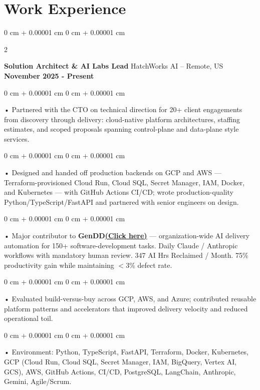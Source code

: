 \documentclass[10pt, letterpaper]{article}
\newenvironment{onecolentry}{
    \begin{adjustwidth}{
        0 cm + 0.00001 cm
    }{
        0 cm + 0.00001 cm
    }
}{
    \end{adjustwidth}
} %
\newenvironment{twocolentry}[2][]{
    \onecolentry
    \def\secondColumn{#2}
    \setcolumnwidth{\fill, 4.5 cm}
    \begin{paracol}{2}
}{
    \switchcolumn \raggedleft \secondColumn
    \end{paracol}
    \endonecolentry
} %
\begin{document}
    \vspace{0.15cm}
    \section{Work Experience}
        \vspace{0.1cm}

        \begin{twocolentry}{
            \textbf{November 2025 - Present}
        }
            \textbf{Solution Architect \& AI Labs Lead} HatchWorks AI -- Remote, US\end{twocolentry}

        \begin{onecolentry}
             • Partnered with the CTO on technical direction for 20+ client engagements from discovery through delivery: cloud-native platform architectures, staffing estimates, and scoped proposals spanning control-plane and data-plane style services.
        \end{onecolentry}
        \begin{onecolentry}
             • Designed and handed off production backends on GCP and AWS --- Terraform-provisioned Cloud Run, Cloud SQL, Secret Manager, IAM, Docker, and Kubernetes --- with GitHub Actions CI/CD; wrote production-quality Python/TypeScript/FastAPI and partnered with senior engineers on design.
        \end{onecolentry}
        \begin{onecolentry}
             • Major contributor to \textbf{GenDD}\href{https://hatchworks.com/generative-driven-development/}{\textbf{(Click here)}} --- organization-wide AI delivery automation for 150+ software-development tasks. Daily Claude / Anthropic workflows with mandatory human review. 347 AI Hrs Reclaimed / Month. 75\% productivity gain while maintaining $<$3\% defect rate.
        \end{onecolentry}
        \begin{onecolentry}
             • Evaluated build-versus-buy across GCP, AWS, and Azure; contributed reusable platform patterns and accelerators that improved delivery velocity and reduced operational toil.
        \end{onecolentry}
        \begin{onecolentry}
             • Environment: Python, TypeScript, FastAPI, Terraform, Docker, Kubernetes, GCP (Cloud Run, Cloud SQL, Secret Manager, IAM, BigQuery, Vertex AI, GCS), AWS, GitHub Actions, CI/CD, PostgreSQL, LangChain, Anthropic, Gemini, Agile/Scrum.
        \end{onecolentry}
\end{document}
